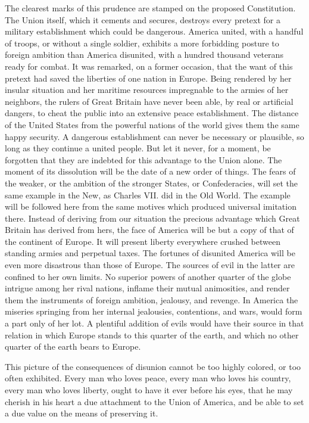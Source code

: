 The clearest marks of this prudence are stamped on the proposed Constitution. The Union itself, which it cements and secures, destroys every pretext for a military establishment which could be dangerous. America united, with a handful of troops, or without a single soldier, exhibits a more forbidding posture to foreign ambition than America disunited, with a hundred thousand veterans ready for combat. It was remarked, on a former occasion, that the want of this pretext had saved the liberties of one nation in Europe. Being rendered by her insular situation and her maritime resources impregnable to the armies of her neighbors, the rulers of Great Britain have never been able, by real or artificial dangers, to cheat the public into an extensive peace establishment. The distance of the United States from the powerful nations of the world gives them the same happy security. A dangerous establishment can never be necessary or plausible, so long as they continue a united people. But let it never, for a moment, be forgotten that they are indebted for this advantage to the Union alone. The moment of its dissolution will be the date of a new order of things. The fears of the weaker, or the ambition of the stronger States, or Confederacies, will set the same example in the New, as Charles VII. did in the Old World. The example will be followed here from the same motives which produced universal imitation there. Instead of deriving from our situation the precious advantage which Great Britain has derived from hers, the face of America will be but a copy of that of the continent of Europe. It will present liberty everywhere crushed between standing armies and perpetual taxes. The fortunes of disunited America will be even more disastrous than those of Europe. The sources of evil in the latter are confined to her own limits. No superior powers of another quarter of the globe intrigue among her rival nations, inflame their mutual animosities, and render them the instruments of foreign ambition, jealousy, and revenge. In America the miseries springing from her internal jealousies, contentions, and wars, would form a part only of her lot. A plentiful addition of evils would have their source in that relation in which Europe stands to this quarter of the earth, and which no other quarter of the earth bears to Europe.

This picture of the consequences of disunion cannot be too highly colored, or too often exhibited. Every man who loves peace, every man who loves his country, every man who loves liberty, ought to have it ever before his eyes, that he may cherish in his heart a due attachment to the Union of America, and be able to set a due value on the means of preserving it.

